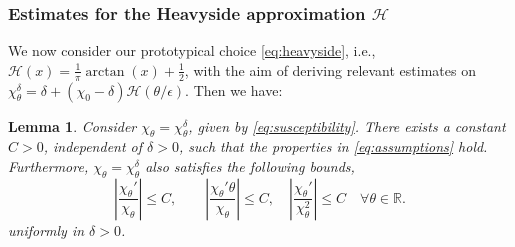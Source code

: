 \documentclass[10pt,letterpaper,twoside]{amsart}
\newtheorem{lemma}{Lemma}[section]
\theoremstyle{definition}{\newtheorem{definition}[lemma]{Definition}}
\theoremstyle{note}{\newtheorem{claim}{Claim}[section]
\newtheorem*{claim*}{Claim}}
\numberwithin{equation}{section}
\newcommand{\R}{\mathbb{R}}
\begin{document}
\subsubsection{Estimates for the Heavyside approximation $\mathcal{H}$}%
We now consider our prototypical choice \eqref{eq:heavyside}, i.e., $\mathcal{H}(x) = \frac{1}{\pi} \arctan(x) + \frac{1}{2}$,
with the aim of deriving relevant estimates on $\chi^\delta_\theta = \delta  + (\chi_0 - \delta) \mathcal{H}(\theta/\epsilon)$.  Then we have:
\begin{lemma}
\label{lem:heavyside}
Consider $\chi_\theta = \chi^\delta_\theta$, given by \eqref{eq:susceptibility}. There exists a constant $C>0$, independent of $\delta>0$, such that the properties in \eqref{eq:assumptions} hold. Furthermore, $\chi_\theta = \chi^\delta_\theta$ also satisfies the following bounds,
\begin{equation}\label{eq:heavysidelemma}
\left| \frac{\chi_\theta'}{\chi_{\theta}}\right|\leq C, 
\qquad  \left| \frac{\chi_\theta' \theta}{\chi_{\theta}}\right|\leq C,
\quad \left|\frac{\chi_\theta'}{\chi_{\theta}^2}\right|\leq C \quad \forall  \theta\in\R.
\end{equation}
uniformly in $\delta>0$.
\end{lemma}
\end{document}
